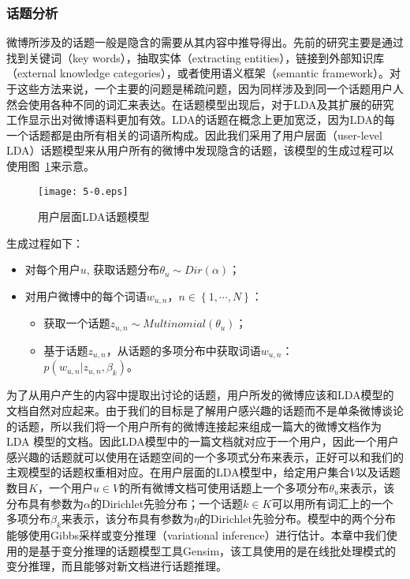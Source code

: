 \subsubsection{话题分析}
\label{topic}
微博所涉及的话题一般是隐含的需要从其内容中推导得出。先前的研究主要是通过找到关键词（key words），抽取实体（extracting  entities），链接到外部知识库（external knowledge categories），或者使用语义框架（semantic framework）。对于这些方法来说，一个主要的问题是稀疏问题，因为同样涉及到同一个话题用户人然会使用各种不同的词汇来表达。在话题模型出现后，对于LDA及其扩展的研究工作显示出对微博语料更加有效。LDA的话题在概念上更加宽泛，因为LDA的每一个话题都是由所有相关的词语所构成。因此我们采用了用户层面（user-level LDA）话题模型来从用户所有的微博中发现隐含的话题，该模型的生成过程可以使用图~\ref{fig5-1}来示意。

\begin{figure}[htb]
\centering
\texttt{[image: 5-0.eps]}
\caption{用户层面LDA话题模型}
\label{fig5-1}
\end{figure}

生成过程如下：
\begin{itemize}
\item 对每个用户$ u $, 获取话题分布$ \theta_{u} \sim Dir \left(  \alpha \right) $；
\item 对用户微博中的每个词语$ w_{u,n} $，$ n \in \left\lbrace 1, \cdots, N \right\rbrace $：
\begin{itemize}
\item 获取一个话题$ z_{u,n} \sim Multinomial \left( \theta_{u}  \right) $；
\item 基于话题$ z_{u,n} $，从话题的多项分布中获取词语$ w_{u,n} $：\\ 
$ p \left( w_{u,n} \vert z_{u,n}, \beta_{k}  \right) $。
\end{itemize}
\end{itemize}

为了从用户产生的内容中提取出讨论的话题，用户所发的微博应该和LDA模型的文档自然对应起来。由于我们的目标是了解用户感兴趣的话题而不是单条微博谈论的话题，所以我们将一个用户所有的微博连接起来组成一篇大的微博文档作为LDA 模型的文档。因此LDA模型中的一篇文档就对应于一个用户，因此一个用户感兴趣的话题就可以使用在话题空间的一个多项式分布来表示，正好可以和我们的主观模型的话题权重相对应。在用户层面的LDA模型中，给定用户集合$ V $以及话题数目$ K $，一个用户$ u \in V $的所有微博文档可使用话题上一个多项分布$ \theta_{u} $来表示，该分布具有参数为$ \alpha $的Dirichlet先验分布；一个话题$ k \in K $可以用所有词汇上的一个多项分布$ \beta_{k} $来表示，该分布具有参数为$ \eta $的Dirichlet先验分布。模型中的两个分布能够使用Gibbs采样或变分推理（variational inference）进行估计。本章中我们使用的是基于变分推理的话题模型工具Gensim，该工具使用的是在线批处理模式的变分推理，而且能够对新文档进行话题推理。

